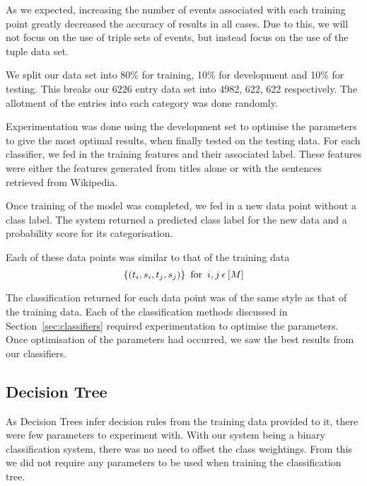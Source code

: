 \documentclass[bsc,frontabs,twoside,singlespacing,parskip,deptreport]{infthesis}     %
\begin{document}
As we expected, increasing the number of events associated with each training point greatly decreased the accuracy of results in all cases.
Due to this, we will not focus on the use of triple sets of events, but instead focus on the use of the tuple data set.

We split our data set into 80\% for training, 10\% for development and 10\% for testing.
This breaks our 6226 entry data set into 4982, 622, 622 respectively.
The allotment of the entries into each category was done randomly.

Experimentation was done using the development set to optimise the parameters to give the most optimal results,
when finally tested on the testing data.
For each classifier, we fed in the training features and their associated label. These features were
either the features generated from titles alone or with the sentences retrieved from Wikipedia.

Once training of the model was completed, we fed in a new data point without a class label.
The system returned a predicted class label for the new data and a probability score for its categorisation.

Each of these data points was similar to that of the training data
 \begin{equation}
   \{(t_{i},s_{i},t_{j},s_{j})\} \hspace{0.5em} \text{for} \hspace{0.5em} i,j \hspace{0.2em}\epsilon \hspace{0.2em}[M]\nonumber
 \end{equation}

 The classification returned for each data point was of the same style as that of the training data.
 Each of the classification methods discussed in Section~\ref{sec:classifiers} required experimentation to optimise the
 parameters. Once optimisation of the parameters had occurred, we saw the best results from our classifiers.

 \subsection{Decision Tree}
 As Decision Trees infer decision rules from the training data provided to it, there were few parameters to
 experiment with. With our system being a binary classification system, there was no need to offset the class weightings.
 From this we did not require any parameters to be used when training the classification tree.
 
\end{document}
